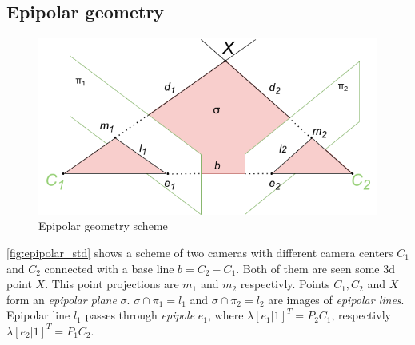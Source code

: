 \subsection{Epipolar geometry}
\begin{figure}[h]
    \centering
    \includegraphics[width=1\textwidth]{graphics/epipolar.png}
    \caption{Epipolar geometry scheme}
    \label{fig:epipolar_std}
\end{figure}
\autoref{fig:epipolar_std} shows a scheme of two cameras with different camera centers $C_1$ and $C_2$ connected with a base line $b = C_2 - C_1$. 
Both of them are seen some 3d point $X$. 
This point projections are $m_1$ and $m_2$ respectivly. 
Points $C_1, C_2$ and $X$ form an \textit{epipolar plane} $\sigma$.
$\sigma \cap \pi_1 = l_1$ and $\sigma \cap \pi_2 = l_2$ are images of \textit{epipolar lines}. 
Epipolar line $l_1$ passes through \textit{epipole} $e_1$, where $\lambda [e_1 | 1]^T = P_2 C_1$, respectivly $\lambda [e_2 | 1]^T = P_1 C_2$.

